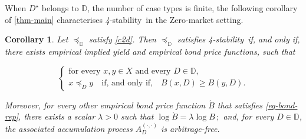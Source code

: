 \documentclass[ecta,nameyear,draft]{econsocart}
\newcommand{\mbbd}{{\mathds D}}
\newcommand{\dd}{{(\cdot,\cdot)}}
\newcommand{\stability}{\textit{4}-\textup{{stability}}}
\theoremstyle{plain}
\newtheorem{corollary}{Corollary}%
\theoremstyle{remark}
\begin{document}
When $D^{\star}$ belongs to $\mbbd$, the number of case types is finite, the
following corollary of \cref{thm-main} characterises \stability\ in the
Zero-market setting.
\begin{corollary}\label{cor-bond-rep} Let $\preceq_{\mbbd}$ satisfy \ref{c2d}.
  Then $\preceq_{\mbbd}$ satisfies \stability\ if, and only if, there exists
  empirical implied yield and empirical bond price functions, such that
  \begin{linenomath*} 
    \begin{equation}\tag{$*$}\label{eq-bond-rep} \left\{
        \begin{array}{l}
          \text{for every $x , y \in X$ and every $D \in \mbbd$,}\\
          x \preceq_{D} y \quad \text{if, and only if,}\quad B(x,D) \geq B(y,D).
      \end{array}\right.
    \end{equation}
  \end{linenomath*} 
  Moreover, for every other empirical bond price function $\acute{B}$ that
  satisfies \eqref{eq-bond-rep}, there exists a scalar $\lambda > 0$ such that
  $\log \acute{B} = \lambda \log B\,;$ and, for every $D\in \mbbd$, the
  associated accumulation process ${A}^{\dd}_{D}$ is arbitrage-free.

\end{corollary}
\end{document}
